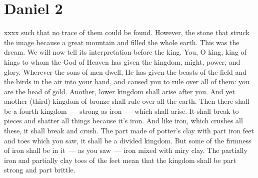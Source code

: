 \section{Daniel 2}\label{Daniel 2}
\begin{enumerate}[align=center]
     xxxx such that no trace of them could be found. However, the stone that struck the image because a great mountain and filled the whole earth.%
     This was the dream. We will now tell its interpretation before the king.%
     You, O king, king of kings to whom the God of Heaven has given the kingdom, might, power, and glory.%
     Wherever the sons of men dwell, He has given the beasts of the field and the birds in the air into your hand, and caused you to rule over all of them: you are the head of gold.%
     Another, lower kingdom shall arise after you. And yet another (third) kingdom of bronze shall rule over all the earth.%
     Then there shall be a fourth kingdom~--- strong as iron~--- which shall arise. It shall break to pieces and shatter all things because it's iron. And like iron, which crushes all these, it shall break and crush.%
     The part made of potter's clay with part iron feet and toes which you saw, it shall be a divided kingdom. But some of the firmness of iron shall be in it~--- as you saw~--- iron mixed with miry clay.%
     The partially iron and partially clay toes of the feet mean that the kingdom shall be part strong and part brittle.%

\end{enumerate}
